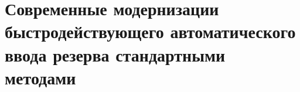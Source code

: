 \chapter{Современные модернизации быстродействующего автоматического ввода резерва стандартными методами}

\label{ch:bavr_modernization}

